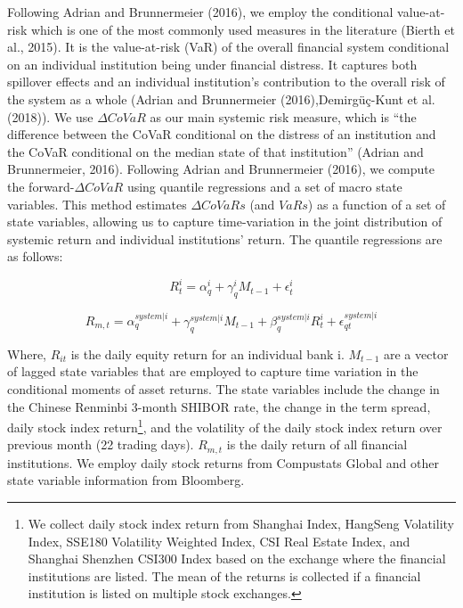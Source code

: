 \documentclass[
  12pt,
  a4paper,
]{scrreprt}
\begin{document}
{{{{Following Adrian and Brunnermeier (2016), we employ the conditional
value-at-risk which is one of the most commonly used measures in the
literature (Bierth et al., 2015). It is the value-at-risk (VaR) of the
overall financial system conditional on an individual institution being
under financial distress. It captures both spillover effects and an
individual institution's contribution to the overall risk of the system
as a whole (Adrian and Brunnermeier (2016),Demirgüç-Kunt et al. (2018)).
We use \(\Delta CoVaR\) as our main systemic risk measure, which is
``the difference between the CoVaR conditional on the distress of an
institution and the CoVaR conditional on the median state of that
institution'' (Adrian and Brunnermeier, 2016). Following Adrian and
Brunnermeier (2016), we compute the forward-\(\Delta CoVaR\) using
quantile regressions and a set of macro state variables. This method
estimates \(\Delta CoVaRs\) (and \(VaRs\)) as a function of a set of
state variables, allowing us to capture time-variation in the joint
distribution of systemic return and individual institutions' return. The
quantile regressions are as follows:

\begin{equation}
\tag{2}
R^{i}_{t} = \alpha^{i}_{q} + \gamma^{i}_{q}M_{t-1} + \epsilon^{i}_{t}
\end{equation}

\begin{equation}
\tag{3}
R_{m,t} = \alpha^{system|i}_{q} + \gamma^{system|i}_{q}M_{t-1} + \beta^{system|i}_{q}R^{i}_{t} + \epsilon^{system|i}_{qt}
\end{equation}

Where, \(R_{it}\) is the daily equity return for an individual bank i.
\(M_{t-1}\) are a vector of lagged state variables that are employed to
capture time variation in the conditional moments of asset returns. The
state variables include the change in the Chinese Renminbi 3-month
SHIBOR rate, the change in the term spread, daily stock index
return\footnote{We collect daily stock index return from Shanghai Index,
  HangSeng Volatility Index, SSE180 Volatility Weighted Index, CSI Real
  Estate Index, and Shanghai Shenzhen CSI300 Index based on the exchange
  where the financial institutions are listed. The mean of the returns
  is collected if a financial institution is listed on multiple stock
  exchanges.}, and the volatility of the daily stock index return over
previous month (22 trading days). \(R_{m,t}\) is the daily return of all
financial institutions. We employ daily stock returns from Compustats
Global and other state variable information from Bloomberg.

}}}}
\end{document}
